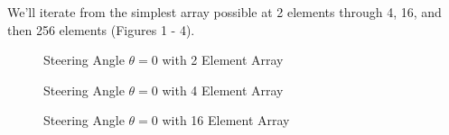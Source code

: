 \documentclass[10pt,a5paper]{book}
\begin{document}
We'll iterate from the simplest array possible at 2 elements through 4, 16, and then 256 elements (Figures 1 - 4). 

\begin{figure}[!htb]
\caption{\label{fig:my-label} Steering Angle $\theta=0$ with 2 Element Array}
\end{figure}

\begin{figure}[!htb]
\caption{\label{fig:my-label} Steering Angle $\theta=0$ with 4 Element Array}
\end{figure}

\begin{figure}[!htb]
\caption{\label{fig:my-label} Steering Angle $\theta=0$ with 16 Element Array}
\end{figure}
\end{document}
